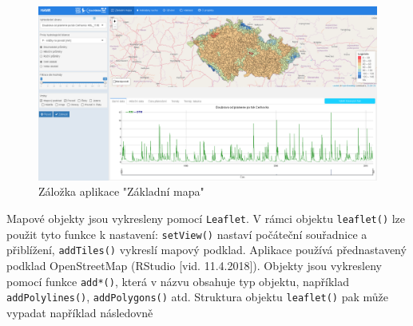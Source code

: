 \documentclass[12pt,]{article}
\newenvironment{Shaded}{\begin{snugshade}}{\end{snugshade}}
\newcommand{\KeywordTok}[1]{\textcolor[rgb]{0.13,0.29,0.53}{\textbf{#1}}}
\newcommand{\DataTypeTok}[1]{\textcolor[rgb]{0.13,0.29,0.53}{#1}}
\newcommand{\StringTok}[1]{\textcolor[rgb]{0.31,0.60,0.02}{#1}}
\newcommand{\OperatorTok}[1]{\textcolor[rgb]{0.81,0.36,0.00}{\textbf{#1}}}
\newcommand{\NormalTok}[1]{#1}
\begin{document}
\begin{figure}[H]
      \includegraphics[width=\textwidth]{fig/P_ZM}
      \caption{Záložka aplikace "Základní mapa"}
      \label{fig:ch5.3}
\end{figure}

\begin{Shaded}
\end{Shaded}

\qquad Mapové objekty jsou vykresleny pomocí \texttt{Leaflet}. V rámci
objektu \texttt{leaflet()} lze použit tyto funkce k nastavení:
\texttt{setView()} nastaví počáteční souřadnice a přiblížení,
\texttt{addTiles()} vykreslí mapový podklad. Aplikace používá
přednastavený podklad OpenStreetMap (RStudio {[}vid. 11.4.2018{]}).
Objekty jsou vykresleny pomocí funkce \texttt{add*()}, která v názvu
obsahuje typ objektu, například \texttt{addPolylines()},
\texttt{addPolygons()} atd. Struktura objektu \texttt{leaflet()} pak
může vypadat například následovně

\begin{Shaded}
\end{Shaded}
\end{document}
